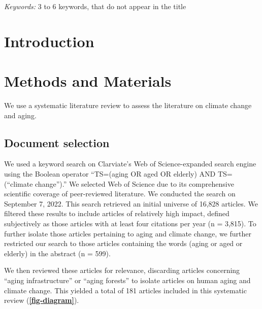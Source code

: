 \documentclass[12pt]{article}
\begin{document}
\noindent%
{\it Keywords:} 3 to 6 keywords, that do not appear in the title
\vfill

\newpage
{} %

\hypertarget{introduction}{%
\section{Introduction}\label{introduction}}

\hypertarget{methods-and-materials}{%
\section{Methods and Materials}\label{methods-and-materials}}

We use a systematic literature review to assess the literature on
climate change and aging.

\hypertarget{document-selection}{%
\subsection{Document selection}\label{document-selection}}

We used a keyword search on Clarviate's Web of Science-expanded search
engine using the Boolean operator ``TS=(aging OR aged OR elderly) AND
TS=(``climate change'').'' We selected Web of Science due to its
comprehensive scientific coverage of peer-reviewed literature. We
conducted the search on September 7, 2022. This search retrieved an
initial universe of 16,828 articles. We filtered these results to
include articles of relatively high impact, defined subjectively as
those articles with at least four citations per year (n = 3,815). To
further isolate those articles pertaining to aging and climate change,
we further restricted our search to those articles containing the words
(aging or aged or elderly) in the abstract (n = 599).

We then reviewed these articles for relevance, discarding articles
concerning ``aging infrastructure'' or ``aging forests'' to isolate
articles on human aging and climate change. This yielded a total of 181
articles included in this systematic review
(\textbf{\autoref{fig-diagram}}).
\end{document}
